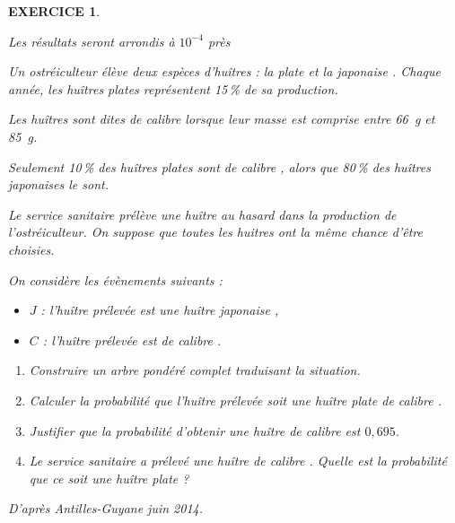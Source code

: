 \documentclass[a4paper]{article}   %
\renewcommand{\(}{\left(}
\renewcommand{\)}{\right)}
\newtheorem{EXO}{\large EXERCICE }
\newenvironment{EX}   { \setcounter{ques}{0} \begin{EXO} \hrulefill ~\vspace{0.3cm}

\normalfont}    {\end{EXO} \medskip}
\begin{document}
\begin{EX}
\emph{Les résultats seront arrondis à $10^{-4}$ près}

\medskip
 
Un ostréiculteur élève deux espèces d'huîtres : \og la plate \fg{} et \og la japonaise \fg. Chaque année, les huîtres plates représentent 15\,\% de sa production.
 
Les huîtres sont dites de calibre  lorsque leur masse est comprise entre 66~g et 85~g.
 
Seulement 10\,\% des huîtres plates sont de calibre , alors que 80\,\% des huîtres japonaises le sont.

\medskip
 
Le service sanitaire prélève une huître au hasard dans la production de l'ostréiculteur. On suppose que toutes les huitres ont la même chance d'être choisies.
 
On considère les évènements suivants : 

\setlength\parindent{8mm}
\begin{itemize}
\item[$\bullet~~$] $J$ : \og l'huître prélevée est une huître japonaise \fg, 
\item[$\bullet~~$] $C$ : \og l'huître prélevée est de calibre  \fg.
\end{itemize}
\setlength\parindent{0mm}
 
	\begin{enumerate}
		\item Construire un arbre pondéré complet traduisant la situation. 
		\item Calculer la probabilité que l'huître prélevée soit une huître plate de calibre . 
		\item Justifier que la probabilité d'obtenir une huître de calibre  est $0,695$. 
		\item Le service sanitaire a prélevé une huître de calibre . 
Quelle est la probabilité que ce soit une huître plate ?
	\end{enumerate} 

\hfill \emph{D'après Antilles-Guyane juin 2014.}
\end{EX}
\end{document}
